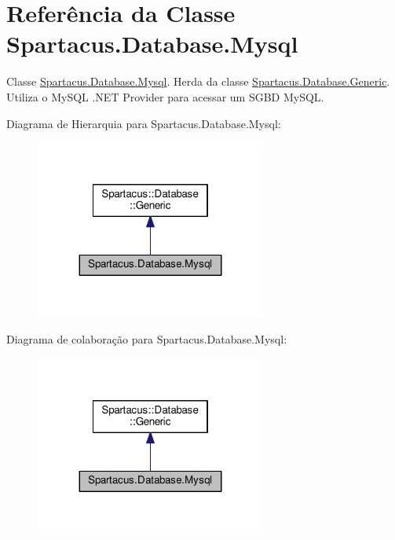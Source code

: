 \hypertarget{classSpartacus_1_1Database_1_1Mysql}{\section{Referência da Classe Spartacus.\+Database.\+Mysql}
\label{classSpartacus_1_1Database_1_1Mysql}
}


Classe \hyperlink{classSpartacus_1_1Database_1_1Mysql}{Spartacus.\+Database.\+Mysql}. Herda da classe \hyperlink{classSpartacus_1_1Database_1_1Generic}{Spartacus.\+Database.\+Generic}. Utiliza o My\+S\+Q\+L .N\+E\+T Provider para acessar um S\+G\+B\+D My\+S\+Q\+L.  




Diagrama de Hierarquia para Spartacus.\+Database.\+Mysql\+:
\nopagebreak
\begin{figure}[H]
\begin{center}
\leavevmode
\includegraphics[width=215pt]{classSpartacus_1_1Database_1_1Mysql__inherit__graph}
\end{center}
\end{figure}


Diagrama de colaboração para Spartacus.\+Database.\+Mysql\+:
\nopagebreak
\begin{figure}[H]
\begin{center}
\leavevmode
\includegraphics[width=215pt]{classSpartacus_1_1Database_1_1Mysql__coll__graph}
\end{center}
\end{figure}
